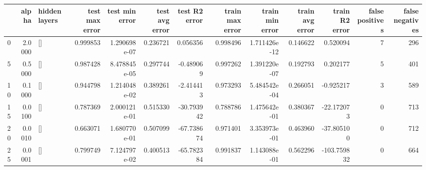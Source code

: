 
\begin{table}[ht]
\tiny\begin{tabular}{lrlrrrrrrrrrr}
\toprule
{} &   alpha & hidden layers &  test max error &  test min error &  test avg error &  test R2 error &  train max error &  train min error &  train avg error &  train R2 error &  false positives &  false negatives \\
\midrule
0  &  2.0000 &            [] &        0.999853 &    1.290698e-07 &        0.236721 &       0.056356 &         0.998496 &     1.711426e-12 &         0.146622 &        0.520094 &                7 &              296 \\
5  &  0.5000 &            [] &        0.987428 &    8.478845e-05 &        0.297744 &      -0.489069 &         0.997262 &     1.391220e-07 &         0.192793 &        0.202177 &                5 &              401 \\
10 &  0.1000 &            [] &        0.944798 &    1.214048e-02 &        0.389261 &      -2.414413 &         0.973293 &     5.484542e-04 &         0.266051 &       -0.925217 &                3 &              589 \\
15 &  0.0100 &            [] &        0.787369 &    2.000121e-01 &        0.515330 &     -30.793942 &         0.788786 &     1.475642e-01 &         0.380367 &      -22.172073 &                0 &              713 \\
20 &  0.0010 &            [] &        0.663071 &    1.680770e-01 &        0.507099 &     -67.738674 &         0.971401 &     3.353973e-01 &         0.463960 &      -37.805100 &                0 &              712 \\
25 &  0.0001 &            [] &        0.799749 &    7.124797e-02 &        0.400513 &     -65.782384 &         0.991837 &     1.143088e-01 &         0.562296 &     -103.759832 &                0 &              664 \\
\bottomrule
\end{tabular}
\end{table}
